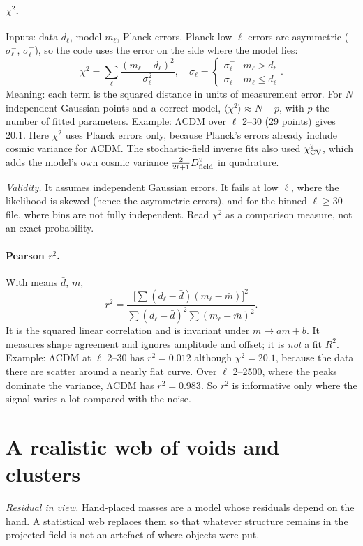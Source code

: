 \documentclass[10pt,twocolumn]{article}
\newcommand{\why}[1]{\par\noindent\textit{Validity.} #1\par}
\begin{document}
\paragraph{$\chi^2$.} Inputs: data $d_\ell$, model $m_\ell$, Planck errors. Planck low-$\ell$ errors are asymmetric ($\sigma^-_\ell$, $\sigma^+_\ell$), so the code uses the error on the side where the model lies:
\begin{equation}
\chi^2=\sum_\ell\frac{(m_\ell-d_\ell)^2}{\sigma_\ell^2},\quad\sigma_\ell=\begin{cases}\sigma^+_\ell&m_\ell>d_\ell\\\sigma^-_\ell&m_\ell\le d_\ell\end{cases}.
\end{equation}
Meaning: each term is the squared distance in units of measurement error. For $N$ independent Gaussian points and a correct model, $\langle\chi^2\rangle\approx N-p$, with $p$ the number of fitted parameters. Example: ΛCDM over $\ell$ 2--30 (29 points) gives 20.1. Here $\chi^2$ uses Planck errors only, because Planck's errors already include cosmic variance for ΛCDM. The stochastic-field inverse fits also used $\chi^2_{\rm CV}$, which adds the model's own cosmic variance $\tfrac{2}{2\ell+1}D_{\rm field}^2$ in quadrature.
\why{It assumes independent Gaussian errors. It fails at low $\ell$, where the likelihood is skewed (hence the asymmetric errors), and for the binned $\ell\ge30$ file, where bins are not fully independent. Read $\chi^2$ as a comparison measure, not an exact probability.}

\paragraph{Pearson $r^2$.} With means $\bar d$, $\bar m$,
\begin{equation}
r^2=\frac{\big[\sum(d_\ell-\bar d)(m_\ell-\bar m)\big]^2}{\sum(d_\ell-\bar d)^2\sum(m_\ell-\bar m)^2}.
\end{equation}
It is the squared linear correlation and is invariant under $m\to am+b$. It measures shape agreement and ignores amplitude and offset; it is \emph{not} a fit $R^2$. Example: ΛCDM at $\ell$ 2--30 has $r^2=0.012$ although $\chi^2=20.1$, because the data there are scatter around a nearly flat curve. Over $\ell$ 2--2500, where the peaks dominate the variance, ΛCDM has $r^2=0.983$. So $r^2$ is informative only where the signal varies a lot compared with the noise.

\section{A realistic web of voids and clusters}
\noindent\emph{Residual in view.} Hand-placed masses are a model whose residuals depend on the hand. A statistical web replaces them so that whatever structure remains in the projected field is not an artefact of where objects were put.
\end{document}
